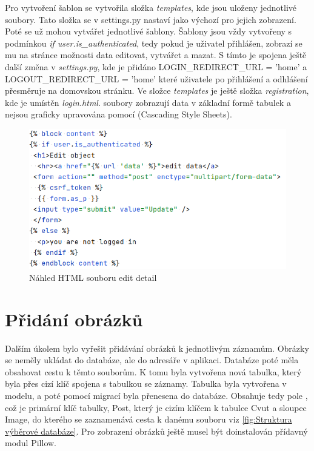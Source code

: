 Pro vytvoření  šablon se vytvořila složka \emph{templates}, kde
jsou uloženy jednotlivé  soubory. Tato složka se v settings.py
nastaví jako výchozí pro jejich zobrazení. Poté se už mohou vytvářet
jednotlivé šablony. Šablony jsou vždy vytvořeny s podmínkou \emph{if
  user.is\_authenticated}, tedy pokud je uživatel přihlášen, zobrazí
se mu na stránce možnosti data editovat, vytvářet a mazat. S tímto je
spojena ještě další změna v \emph{settings.py}, kde je přidáno
LOGIN\_REDIRECT\_URL = 'home' a LOGOUT\_REDIRECT\_URL
  = 'home' které uživatele po přihlášení a odhlášení přesměruje na
domovskou stránku. Ve složce \emph{templates} je ještě složka
\emph{registration}, kde je umístěn \emph{login.html}.  soubory
zobrazují data v základní formě tabulek a nejsou graficky upravována
pomocí  (Cascading Style Sheets).

\begin{figure}[H] \centering
    \includegraphics[width=350pt]{./pictures/8-edit-detail-html.PNG}
    \caption[Náhled HTML souboru edit detail]{Náhled HTML souboru edit detail}
	\label{fig:Náhled HTML souboru edit detail}
\end{figure}


\newpage

\section{Přidání obrázků}
\label{Přidání obrázků}

Dalším úkolem bylo vyřešit přidávání obrázků k jednotlivým
záznamům. Obrázky se neměly ukládat do databáze, ale do adresáře v
aplikaci. Databáze poté měla obsahovat cestu k těmto souborům. K tomu
byla vytvořena nová tabulka, který byla přes cizí klíč spojena s
tabulkou se záznamy. Tabulka byla vytvořena v modelu, a poté pomocí
migrací byla přenesena do databáze. Obsahuje tedy pole , což je
primární klíč tabulky, Post, který je cizím klíčem k tabulce Cvut a
sloupec Image, do kterého se zaznamenává cesta k danému souboru viz \ref{fig:Struktura výběrové databáze}.
Pro zobrazení obrázků ještě musel být doinstalován přídavný modul Pillow.


